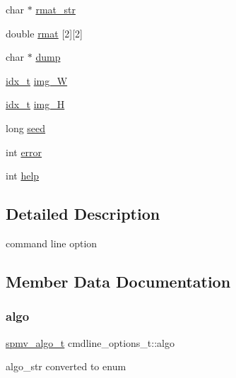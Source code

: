 \begin{DoxyCompactItemize}
\item 
char $\ast$ \hyperlink{structcmdline__options__t_a4ae2cfd5fda7a25e302fff37c1201f93}{rmat\+\_\+str}
\item 
double \hyperlink{structcmdline__options__t_a60e05c62d3fd439c03fd26d9f8078a4b}{rmat} \mbox{[}2\mbox{]}\mbox{[}2\mbox{]}
\item 
char $\ast$ \hyperlink{structcmdline__options__t_aa4b96337328846dd1d2c0ca8eee7933f}{dump}
\item 
\hyperlink{spmv_8cc_a8e93478a00e685bea5e6a3f617bf03a3}{idx\+\_\+t} \hyperlink{structcmdline__options__t_ad1c5aa9c8877bae151ca40373f68a848}{img\+\_\+W}
\item 
\hyperlink{spmv_8cc_a8e93478a00e685bea5e6a3f617bf03a3}{idx\+\_\+t} \hyperlink{structcmdline__options__t_a463c33340772fb1baf377fb67f3d7a40}{img\+\_\+H}
\item 
long \hyperlink{structcmdline__options__t_a065412d7cdc54cdae630389c3fda266e}{seed}
\item 
int \hyperlink{structcmdline__options__t_a25f9087b240da0b93a4295fa5f173c88}{error}
\item 
int \hyperlink{structcmdline__options__t_ab02741e43bb19900e87caaec3a8dd794}{help}
\end{DoxyCompactItemize}


\subsection{Detailed Description}
command line option 

\subsection{Member Data Documentation}
\mbox{\label{structcmdline__options__t_afddf83f65e6e4a14761d84a5e876e6ac}} 
\subsubsection{\texorpdfstring{algo}{algo}}
{\footnotesize\ttfamily \hyperlink{spmv_8cc_ad2cf0493af54bf76c5be68b4634fcab7}{spmv\+\_\+algo\+\_\+t} cmdline\+\_\+options\+\_\+t\+::algo}

algo\+\_\+str converted to enum \mbox{\label{structcmdline__options__t_ae8ab407cdc87a30c1b4cdf6b424c8370}} 
